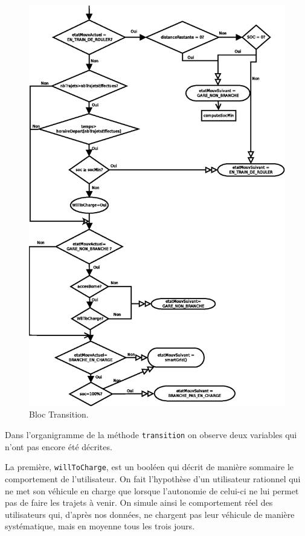 			\begin{figure}
				\centering
				\includegraphics[height=0.9\textheight]{fig/flowTransition.eps}
				\caption{Bloc Transition.\label{fig.flowTransition}}
			\end{figure}
			
			Dans l’organigramme de la méthode \lstinline{transition} on observe deux variables qui n'ont pas encore été décrites.
			
			La première, \lstinline{willToCharge}, est un booléen qui décrit de manière sommaire le comportement de l'utilisateur. On fait l'hypothèse d'un utilisateur rationnel qui ne met son véhicule en charge que lorsque l'autonomie de celui-ci ne lui permet pas de faire les trajets à venir. On simule ainsi le comportement réel des utilisateurs qui, d'après nos données, ne chargent pas leur véhicule de manière systématique, mais en moyenne tous les trois jours.
			
